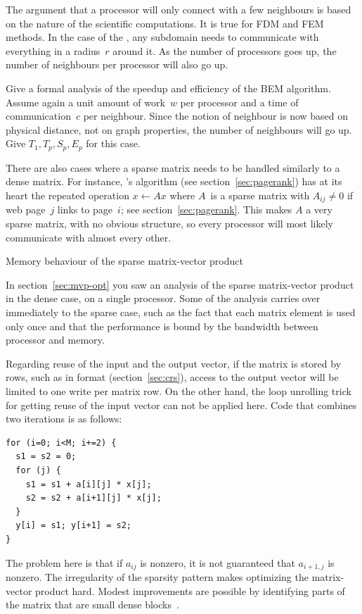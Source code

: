 The argument that a processor will only connect with a few neighbours
is based on the nature of the scientific computations. It is true for
\ac{FDM} and \ac{FEM} methods.
In the case
of the , any subdomain needs to communicate with
everything in a radius~$r$ around it. As the number of processors goes
up, the number of neighbours per processor will also go up.

\begin{exercise}
  Give a formal analysis of the speedup and efficiency of the \ac{BEM}
  algorithm. Assume again a unit amount of work~$w$ per processor and
  a time of communication~$c$ per neighbour. Since the notion of
  neighbour is now based on physical distance, not on graph
  properties, the number of neighbours will go up. Give
  $T_1,T_p,S_p,E_p$ for this case.
\end{exercise}

There are also cases where a sparse matrix needs to be handled
similarly to a dense matrix. For instance, 's
 algorithm (see section~\ref{sec:pagerank}) has at its
heart the repeated operation $x\leftarrow Ax$ where $A$~is a sparse
matrix with $A_{ij}\not=0$ if web page~$j$ links to page~$i$; see
section~\ref{sec:pagerank}. This makes $A$ a very sparse matrix, with
no obvious structure, so every processor will most likely communicate
with almost every other.


 {Memory behaviour of the sparse matrix-vector product}

In section~\ref{sec:mvp-opt} you saw an analysis of the sparse
matrix-vector product in the dense case, on a single processor. Some
of the analysis carries over immediately to the sparse case, such as
the fact that each matrix element is used only once and that the
performance is bound by the bandwidth between processor and memory.

Regarding reuse of the input and the output vector, if the matrix is
stored by rows, such as in  format (section~\ref{sec:crs}),
access to the output vector will be limited to one write per matrix
row.
On the other hand, the loop unrolling
trick for getting reuse of the input vector can not be applied
here. Code that combines two iterations is as follows:
\begin{verbatim}
for (i=0; i<M; i+=2) {
  s1 = s2 = 0;
  for (j) {
    s1 = s1 + a[i][j] * x[j];
    s2 = s2 + a[i+1][j] * x[j];
  }
  y[i] = s1; y[i+1] = s2;
}
\end{verbatim}
The problem here is that if $a_{ij}$ is nonzero, it is not guaranteed
that $a_{i+1,j}$ is nonzero. The irregularity of the sparsity pattern
makes optimizing the matrix-vector product hard. Modest improvements
are possible by identifying parts of the matrix that are small dense
blocks~\cite{ButtEijkLang:spmvp,DemEtAl:ieeeproc2004,oski}.


